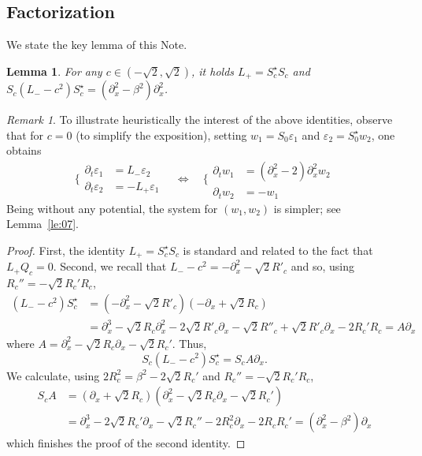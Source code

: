 \documentclass[11pt]{amsart}
\newtheorem{lemma}{Lemma}
\theoremstyle{remark}
\newtheorem{remark}{Remark}
\newcommand\ep{\varepsilon}
\begin{document}
\subsection{Factorization}
We state the key lemma of this Note.
\begin{lemma}\label{le:02}
For any $c\in (-\sqrt{2},\sqrt{2})$, it holds
$
L_+= S_c^\star S_c$ and $S_c (L_- - c^2 ) S_c^\star = (\partial^2_x-\beta^2) \partial_x^2$.
\end{lemma}
\begin{remark}\label{rk:2}
To illustrate heuristically the interest of the above identities, observe that for $c=0$ (to simplify the 
exposition), setting $w_1=S_0 \ep_1$ and $\ep_2 = S_0^\star w_2$, one obtains
\[
\Bigg\{\begin{aligned}
\partial_t\ep_1&=L_-\ep_2 \\
\partial_t\ep_2&=-L_+\ep_1 
\end{aligned}
\quad \iff\quad
\Bigg\{\begin{aligned}
\partial_t w_1&= (\partial_{x}^2-2 )\partial_{x}^2 w_2\\
\partial_t w_2& =-w_1
\end{aligned}
\]
Being without any potential, the system for $(w_1,w_2)$ is simpler;
see Lemma~\ref{le:07}.
\end{remark}
\begin{proof}
First, the identity $L_+= S_c^\star S_c$ is standard and related to 
the fact that $L_+Q_c=0$.
Second, we recall that
$L_- - c^2=-\partial^2_x-\sqrt{2} R'_c$ and so, using $R_c'' = -\sqrt{2}R_c'R_c$,
\begin{align*}
(L_- - c^2) S_c^\star&=(-\partial_x^2-\sqrt{2} R'_c)(-\partial_x+\sqrt{2} R_c)\\
&=\partial_x^3-\sqrt{2}R_c\partial_x^2-2\sqrt 2 R'_c\partial_x-\sqrt 2 R''_c+\sqrt 2 R'_c\partial_x-2 R_c' R_c
=A \partial_x
\end{align*}
where $A=\partial_x^2-\sqrt 2 R_c\partial_x-\sqrt 2R_c'$.
Thus,
\[
S_c (L_- -c^2) S_c^\star=  S_c A\partial_x.
\]
We calculate, using
$2R_c^2=\beta^2-2\sqrt{2}R_c'$ and $R_c'' = -\sqrt{2}R_c'R_c$,
\begin{align*}
S_cA&=(\partial_x+\sqrt 2 R_c)(\partial_x^2-\sqrt 2 R_c\partial_x-\sqrt 2R_c')\\
&=\partial^3_x-2 \sqrt{2} R_c' \partial_x-\sqrt 2 R_c''
-2 R_c^2 \partial_x-2 R_c R_c'=(\partial^2_x-\beta^2) \partial_x
\end{align*}
which finishes the proof of the second identity.
\end{proof}
\end{document}
